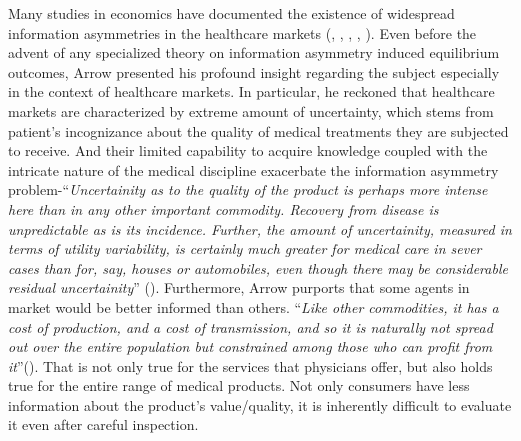 \documentclass[AER]{AEA}
\theoremstyle{theorem}
\begin{document}
Many studies in economics have documented the existence of widespread information asymmetries in the healthcare markets (\cite{mushkinhealth}, \cite{arrow1978uncertainty}, \cite{muntaner2006uncertain}, \cite{d2007effect}, \cite{retchin2007overcoming}). Even before the advent of any specialized theory on information asymmetry induced equilibrium outcomes, Arrow presented his profound insight regarding the subject especially in the context of healthcare markets. In particular, he reckoned that healthcare markets are characterized by extreme amount of uncertainty, which stems from patient's incognizance about the quality of medical treatments they are subjected to receive. And their limited capability to acquire knowledge coupled with the intricate nature of the medical discipline exacerbate the information asymmetry problem-``\textit{Uncertainity as to the quality of the product is perhaps more intense here than in any other important commodity. Recovery from disease is unpredictable as is its incidence. Further, the amount of uncertainity, measured in terms of utility variability, is certainly much greater for medical care in sever cases than for, say, houses or automobiles, even though there may be considerable residual uncertainity}'' (\cite{arrow1978uncertainty}). Furthermore, Arrow purports that some agents in market would be better informed than others. ``\textit{Like other commodities, it has a cost of production, and a cost of transmission, and so it is naturally not spread out over the entire population but constrained among those who can profit from it}''(\cite{arrow1978uncertainty}). That is not only true for the services that physicians offer, but also holds true for the entire range of medical products. Not only consumers have less information about the product's value/quality, it is  inherently difficult to evaluate it even after careful inspection.
\end{document}
